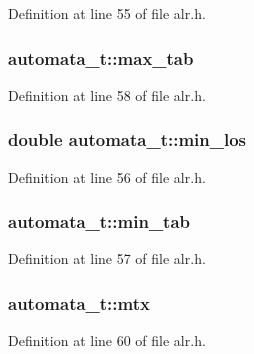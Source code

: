 Definition at line 55 of file alr.\-h.

\hypertarget{structautomata__t_a6f76cc86cd6b6a69a21293f071391122}{
\subsubsection[{max\-\_\-tab}]{ automata\-\_\-t\-::max\-\_\-tab}}\label{structautomata__t_a6f76cc86cd6b6a69a21293f071391122}


Definition at line 58 of file alr.\-h.

\hypertarget{structautomata__t_a1c154215cdc0a2385e5ef4d638b90d7f}{
\subsubsection[{min\-\_\-los}]{\setlength{\rightskip}{0pt plus 5cm}double automata\-\_\-t\-::min\-\_\-los}}\label{structautomata__t_a1c154215cdc0a2385e5ef4d638b90d7f}


Definition at line 56 of file alr.\-h.

\hypertarget{structautomata__t_a42a70ea18f8540b5b62c425a51a716ca}{
\subsubsection[{min\-\_\-tab}]{ automata\-\_\-t\-::min\-\_\-tab}}\label{structautomata__t_a42a70ea18f8540b5b62c425a51a716ca}


Definition at line 57 of file alr.\-h.

\hypertarget{structautomata__t_ad622b3580c94fcb06420e0d67dccfa3d}{
\subsubsection[{mtx}]{ automata\-\_\-t\-::mtx}}\label{structautomata__t_ad622b3580c94fcb06420e0d67dccfa3d}


Definition at line 60 of file alr.\-h.

